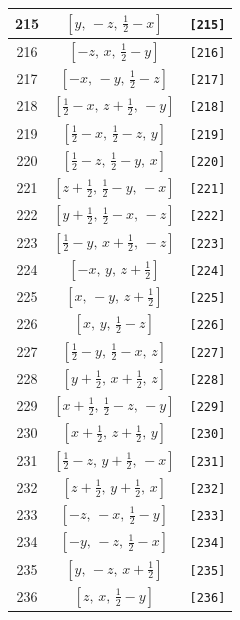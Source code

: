 \documentclass[fleqn,8pt]{jsarticle}
\begin{document}
\begin{longtable}{ccc}
215 & $\left[ y,\, - z,\, \frac{1}{2} - x \right]$ & {\tt [215]} \\ \hline
216 & $\left[ - z,\, x,\, \frac{1}{2} - y \right]$ & {\tt [216]} \\ \hline
217 & $\left[ - x,\, - y,\, \frac{1}{2} - z \right]$ & {\tt [217]} \\ \hline
218 & $\left[ \frac{1}{2} - x,\, z + \frac{1}{2},\, - y \right]$ & {\tt [218]} \\ \hline
219 & $\left[ \frac{1}{2} - x,\, \frac{1}{2} - z,\, y \right]$ & {\tt [219]} \\ \hline
220 & $\left[ \frac{1}{2} - z,\, \frac{1}{2} - y,\, x \right]$ & {\tt [220]} \\ \hline
221 & $\left[ z + \frac{1}{2},\, \frac{1}{2} - y,\, - x \right]$ & {\tt [221]} \\ \hline
222 & $\left[ y + \frac{1}{2},\, \frac{1}{2} - x,\, - z \right]$ & {\tt [222]} \\ \hline
223 & $\left[ \frac{1}{2} - y,\, x + \frac{1}{2},\, - z \right]$ & {\tt [223]} \\ \hline
224 & $\left[ - x,\, y,\, z + \frac{1}{2} \right]$ & {\tt [224]} \\ \hline
225 & $\left[ x,\, - y,\, z + \frac{1}{2} \right]$ & {\tt [225]} \\ \hline
226 & $\left[ x,\, y,\, \frac{1}{2} - z \right]$ & {\tt [226]} \\ \hline
227 & $\left[ \frac{1}{2} - y,\, \frac{1}{2} - x,\, z \right]$ & {\tt [227]} \\ \hline
228 & $\left[ y + \frac{1}{2},\, x + \frac{1}{2},\, z \right]$ & {\tt [228]} \\ \hline
229 & $\left[ x + \frac{1}{2},\, \frac{1}{2} - z,\, - y \right]$ & {\tt [229]} \\ \hline
230 & $\left[ x + \frac{1}{2},\, z + \frac{1}{2},\, y \right]$ & {\tt [230]} \\ \hline
231 & $\left[ \frac{1}{2} - z,\, y + \frac{1}{2},\, - x \right]$ & {\tt [231]} \\ \hline
232 & $\left[ z + \frac{1}{2},\, y + \frac{1}{2},\, x \right]$ & {\tt [232]} \\ \hline
233 & $\left[ - z,\, - x,\, \frac{1}{2} - y \right]$ & {\tt [233]} \\ \hline
234 & $\left[ - y,\, - z,\, \frac{1}{2} - x \right]$ & {\tt [234]} \\ \hline
235 & $\left[ y,\, - z,\, x + \frac{1}{2} \right]$ & {\tt [235]} \\ \hline
236 & $\left[ z,\, x,\, \frac{1}{2} - y \right]$ & {\tt [236]} \\ \hline

\end{longtable}
\end{document}
